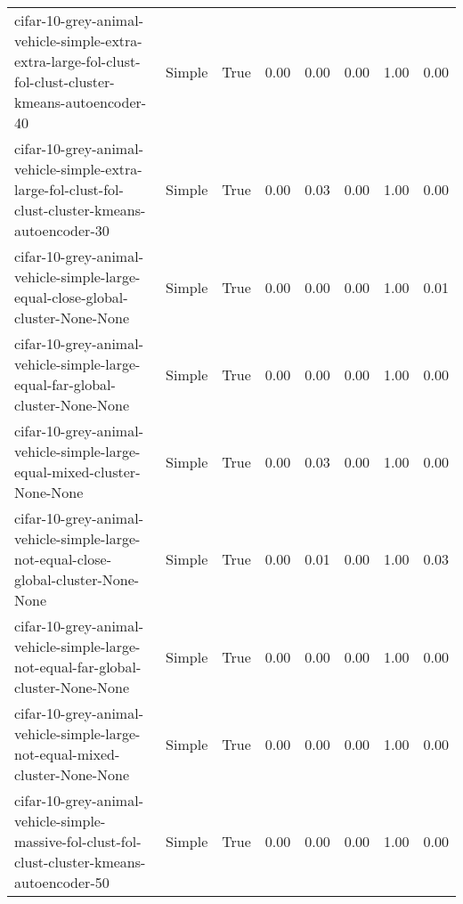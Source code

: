 \begin{longtable}{llllllll}
      cifar-10-grey-animal-vehicle-simple-extra-extra-large-fol-clust-fol-clust-cluster-kmeans-autoencoder-40 &       Simple &        True &                 0.00 &                 0.00 &                         0.00 &                         1.00 &                         0.00 \\
            cifar-10-grey-animal-vehicle-simple-extra-large-fol-clust-fol-clust-cluster-kmeans-autoencoder-30 &       Simple &        True &                 0.00 &                 0.03 &                         0.00 &                         1.00 &                         0.00 \\
                               cifar-10-grey-animal-vehicle-simple-large-equal-close-global-cluster-None-None &       Simple &        True &                 0.00 &                 0.00 &                         0.00 &                         1.00 &                         0.01 \\
                                 cifar-10-grey-animal-vehicle-simple-large-equal-far-global-cluster-None-None &       Simple &        True &                 0.00 &                 0.00 &                         0.00 &                         1.00 &                         0.00 \\
                                      cifar-10-grey-animal-vehicle-simple-large-equal-mixed-cluster-None-None &       Simple &        True &                 0.00 &                 0.03 &                         0.00 &                         1.00 &                         0.00 \\
                           cifar-10-grey-animal-vehicle-simple-large-not-equal-close-global-cluster-None-None &       Simple &        True &                 0.00 &                 0.01 &                         0.00 &                         1.00 &                         0.03 \\
                             cifar-10-grey-animal-vehicle-simple-large-not-equal-far-global-cluster-None-None &       Simple &        True &                 0.00 &                 0.00 &                         0.00 &                         1.00 &                         0.00 \\
                                  cifar-10-grey-animal-vehicle-simple-large-not-equal-mixed-cluster-None-None &       Simple &        True &                 0.00 &                 0.00 &                         0.00 &                         1.00 &                         0.00 \\
                cifar-10-grey-animal-vehicle-simple-massive-fol-clust-fol-clust-cluster-kmeans-autoencoder-50 &       Simple &        True &                 0.00 &                 0.00 &                         0.00 &                         1.00 &                         0.00 \\

\end{longtable}
